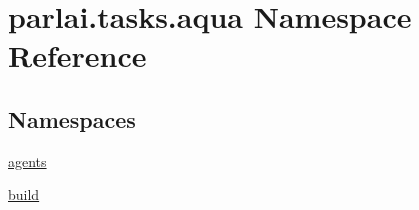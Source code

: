 \hypertarget{namespaceparlai_1_1tasks_1_1aqua}{}\section{parlai.\+tasks.\+aqua Namespace Reference}
\label{namespaceparlai_1_1tasks_1_1aqua}
\subsection*{Namespaces}
\begin{DoxyCompactItemize}
\item 
 \hyperlink{namespaceparlai_1_1tasks_1_1aqua_1_1agents}{agents}
\item 
 \hyperlink{namespaceparlai_1_1tasks_1_1aqua_1_1build}{build}
\end{DoxyCompactItemize}
